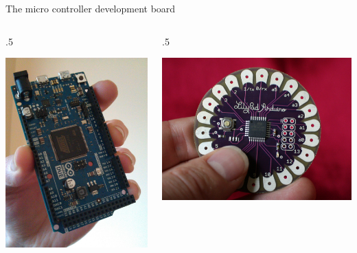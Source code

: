 \begin{frame}{The micro controller development board}
\begin {columns} [c,onlytextwidth]
	\begin {column} [c] {.5\textwidth}
		\begin {center}
			\includegraphics [width=.9\textwidth,keepaspectratio]{img/due}
		\end {center}
	\end {column}
	\pause
	\begin {column} [c] {.5\textwidth}
		\begin {center}
			\includegraphics [width=.9\textwidth,keepaspectratio]{img/lilypad}
		\end {center}
	\end {column}
\end {columns}

\end{frame}
